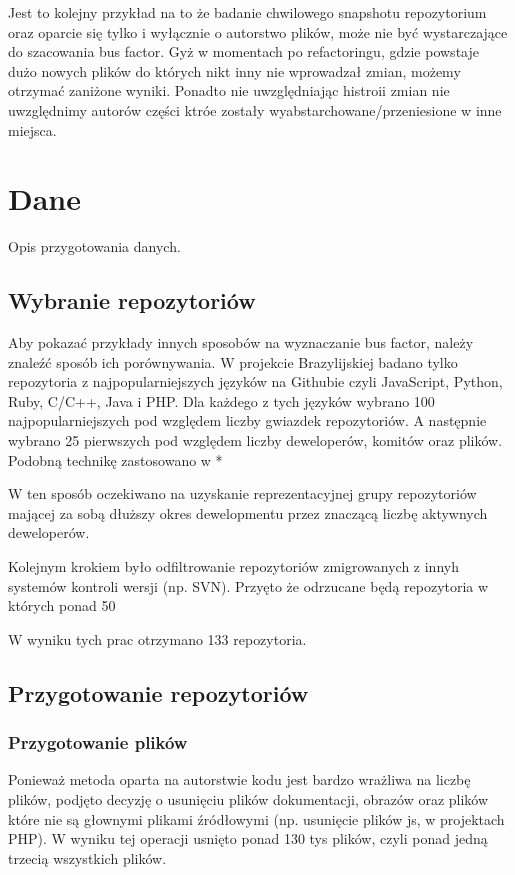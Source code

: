 \documentclass[a4paper,11pt,twoside]{report}
\theoremstyle{definition}
\begin{document}
Jest to kolejny przykład na to że badanie chwilowego snapshotu repozytorium 
oraz oparcie się tylko i wyłącznie o autorstwo plików, może nie być 
wystarczające do szacowania bus factor. Gyż w momentach po refactoringu, 
gdzie powstaje dużo nowych plików do których nikt inny nie wprowadzał 
zmian, możemy otrzymać zaniżone wyniki. Ponadto nie uwzględniając histroii 
zmian nie uwzględnimy autorów części ktróe zostały 
wyabstarchowane/przeniesione w inne miejsca.

\chapter{Dane}

Opis przygotowania danych.

\section{Wybranie repozytoriów}

Aby pokazać przykłady innych sposobów na wyznaczanie bus factor, należy 
znaleźć sposób ich porównywania. W projekcie Brazylijskiej badano tylko 
repozytoria z najpopularniejszych języków na Githubie czyli JavaScript, 
Python, Ruby, C/C++, Java i PHP. Dla każdego z tych języków wybrano 100 
najpopularniejszych pod względem liczby gwiazdek repozytoriów. A następnie 
wybrano 25 pierwszych pod względem liczby deweloperów, komitów oraz plików. 
Podobną technikę zastosowano w *

W ten sposób oczekiwano na uzyskanie reprezentacyjnej grupy repozytoriów 
mającej za sobą dłuższy okres dewelopmentu przez znaczącą liczbę 
aktywnych deweloperów.

Kolejnym krokiem było odfiltrowanie repozytoriów zmigrowanych z innyh 
systemów kontroli wersji (np. SVN). Przyęto że odrzucane będą repozytoria 
w których ponad 50%

W wyniku tych prac otrzymano 133 repozytoria.

\section{Przygotowanie repozytoriów}

\subsection{Przygotowanie plików}

Ponieważ metoda oparta na autorstwie kodu jest bardzo wrażliwa na liczbę 
plików, podjęto decyzję o usunięciu plików dokumentacji, obrazów oraz 
plików które nie są głownymi plikami źródłowymi (np. usunięcie plików 
js, w projektach PHP). W wyniku tej operacji usnięto ponad 130 tys plików, 
czyli ponad jedną trzecią wszystkich plików.
\end{document}

